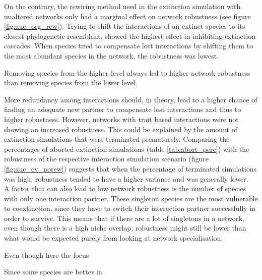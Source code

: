 \documentclass[12pt,a4paper]{article}
\begin{document}
On the contrary, the rewiring method used in the extinction simulation with unaltered networks only had a marginal effect on network robustness (see figure \ref{fig:auc_org_rew}). Trying to shift the interactions of an extinct species to its closest phylogenetic resemblant, showed the highest effect in inhibiting extinction cascades. When species tried to compensate lost interactions by shifting them to the most abundant species in the network, the robustness was lowest.

Removing species from the higher level always led to higher network robustness than removing species from the lower level.
\par

More redundancy among interactions should, in theory, lead to a higher chance of finding an adequate new partner to compensate lost interactions and thus to higher robustness. However, networks with trait based interactions were not showing an increased robustness. This could be explained by the amount of extinction simulations that were terminated prematurely. Comparing the percentages of aborted extinction simulations (table \ref{tab:abort_perc}) with the robustness of the respective interaction simulation scenario (figure \ref{fig:auc_cv_norew}) suggests that when the percentage of terminated simulations was high, robustness tended to have a higher variance and was generally lower.\\ A factor that can also lead to low network robustness is the number of species with only one interaction partner. These singleton species are the most vulnerable to coextinction, since they have to switch their interaction partner successfully in order to survive. This means that if there are a lot of singletons in a network, even though there is a high niche overlap, robustness might still be lower than what would be expected purely from looking at network specialisation.

Even though here the focus 


Since some species are better in




\end{document}
